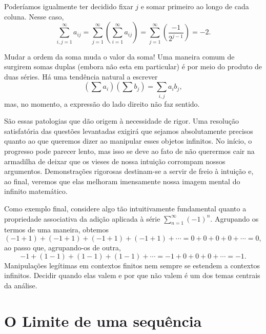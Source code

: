 Poderíamos igualmente ter decidido fixar $j$ e somar primeiro ao longo de cada coluna. Nesse caso,
\[
\sum_{i,j=1}^{\infty}a_{ij}
=\sum_{j=1}^{\infty}\left(\sum_{i=1}^{\infty}a_{ij}\right)
=\sum_{j=1}^{\infty}\left(\frac{-1}{2^{j-1}}\right)=-2.
\]

Mudar a ordem da soma muda o valor da soma! Uma maneira comum de surgirem somas duplas (embora não esta em particular) é por meio do produto de duas séries. Há uma tendência natural a escrever 
\[
\left(\sum a_i\right)\left(\sum b_j\right)=\sum_{i,j}a_i b_j,
\]
mas, no momento, a expressão do lado direito não faz sentido.

São essas patologias que dão origem à necessidade de rigor. Uma resolução satisfatória das questões levantadas exigirá que sejamos absolutamente precisos quanto ao que queremos dizer ao manipular esses objetos infinitos. No início, o progresso pode parecer lento, mas isso se deve ao fato de não querermos cair na armadilha de deixar que os vieses de nossa intuição corrompam nossos argumentos. Demonstrações rigorosas destinam-se a servir de freio à intuição e, ao final, veremos que elas melhoram imensamente nossa imagem mental do infinito matemático.

Como exemplo final, considere algo tão intuitivamente fundamental quanto a propriedade associativa da adição aplicada à série $\sum_{n=1}^{\infty}(-1)^{n}$. Agrupando os termos de uma maneira, obtemos
\[
(-1 + 1) + (-1 + 1) + (-1 + 1) + (-1 + 1) + \cdots = 0 + 0 + 0 + 0 + \cdots = 0,
\]
ao passo que, agrupando-os de outra,
\[
-1 + (1 - 1) + (1 - 1) + (1 - 1) + \cdots = -1 + 0 + 0 + 0 + \cdots = -1.
\]
Manipulações legítimas em contextos finitos nem sempre se estendem a contextos infinitos. Decidir quando elas valem e por que não valem é um dos temas centrais da análise.


\section{O Limite de uma sequência}\label{sec2:limite-sequencia}


